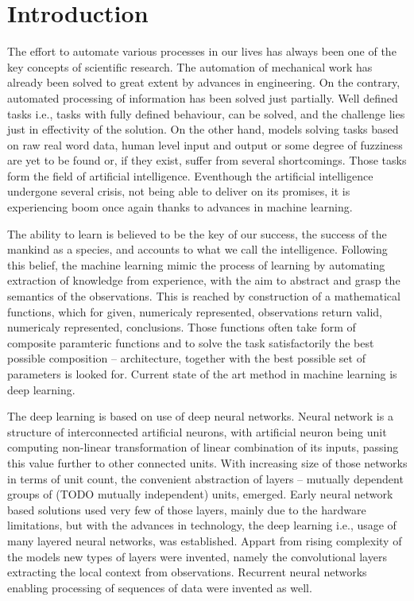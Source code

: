 \chapter*{Introduction}

The effort to automate various processes in our lives has always been one of the key concepts of scientific research. The automation of mechanical work has already been solved to great extent by advances in engineering. On the contrary, automated processing of information has been solved just partially. Well defined tasks i.e., tasks with fully defined behaviour, can be solved, and the challenge lies just in effectivity of the solution. On the other hand, models solving tasks based on raw real word data, human level input and output or some degree of fuzziness are yet to be found or, if they exist, suffer from several shortcomings. Those tasks form the field of artificial intelligence. Eventhough the artificial intelligence undergone several crisis, not being able to deliver on its promises, it is experiencing boom once again thanks to advances in machine learning.

The ability to learn is believed to be the key of our success, the success of the mankind as a species, and accounts to what we call the intelligence. Following this belief, the machine learning mimic the process of learning by automating extraction of knowledge from experience, with the aim to abstract and grasp the semantics of the observations. This is reached by construction of a mathematical functions, which for given, numericaly represented, observations return valid, numericaly represented, conclusions. Those functions often take form of composite paramteric functions and to solve the task satisfactorily the best possible composition -- architecture, together with the best possible set of parameters is looked for. Current state of the art method in machine learning is deep learning.

The deep learning is based on use of deep neural networks. Neural network is a structure of interconnected artificial neurons, with artificial neuron being unit computing non-linear transformation of linear combination of its inputs, passing this value further to other connected units. With increasing size of those networks in terms of unit count, the convenient abstraction of layers -- mutually dependent groups of (TODO mutually independent) units, emerged. Early neural network based solutions used very few of those layers, mainly due to the hardware limitations, but with the advances in technology, the deep learning i.e., usage of many layered neural networks, was established. Appart from rising complexity of the models new types of layers were invented, namely the convolutional layers extracting the local context from observations. Recurrent neural networks enabling processing of sequences of data were invented as well.

